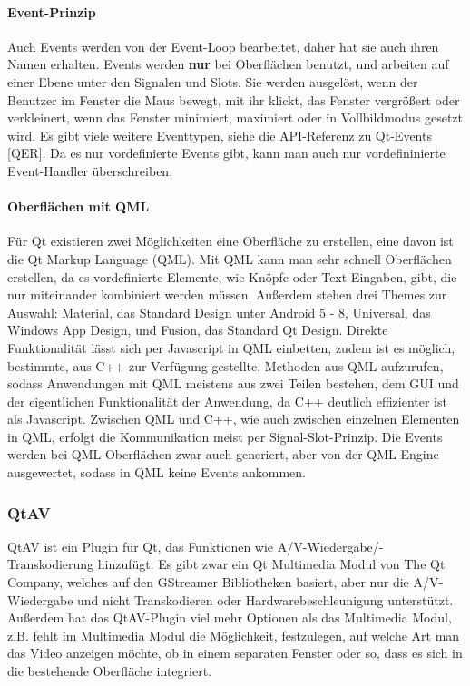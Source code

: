 \documentclass{article}
\begin{document}
    \paragraph{Event-Prinzip}

    Auch Events werden von der Event-Loop bearbeitet, daher hat sie auch
    ihren Namen erhalten. Events werden \textbf{nur} bei Oberflächen
    benutzt, und arbeiten auf einer Ebene unter den Signalen und Slots. Sie
    werden ausgelöst, wenn der Benutzer im Fenster die Maus bewegt, mit ihr
    klickt, das Fenster vergrößert oder verkleinert, wenn das Fenster
    minimiert, maximiert oder in Vollbildmodus gesetzt wird. Es gibt viele
    weitere Eventtypen, siehe die API-Referenz zu Qt-Events {[}QER{]}.
    Da es nur vordefinierte Events gibt, kann man auch nur vordefininierte Event-Handler überschreiben.

    \paragraph{Oberflächen mit QML}
    Für Qt existieren zwei Möglichkeiten eine Oberfläche zu erstellen, eine davon ist die Qt Markup Language (QML).
    Mit QML kann man sehr schnell Oberflächen erstellen, da es vordefinierte Elemente, wie Knöpfe oder Text-Eingaben, gibt, die nur miteinander kombiniert werden müssen.
    Außerdem stehen drei Themes zur Auswahl: Material, das Standard Design unter Android 5 - 8, Universal, das Windows App Design, und Fusion, das Standard Qt Design.
    Direkte Funktionalität lässt sich per Javascript in QML einbetten, zudem ist es möglich, bestimmte, aus C++ zur Verfügung gestellte,
    Methoden aus QML aufzurufen, sodass Anwendungen mit QML meistens aus zwei Teilen bestehen, dem GUI und
    der eigentlichen Funktionalität der Anwendung, da C++ deutlich effizienter ist als Javascript.
    Zwischen QML und C++, wie auch zwischen einzelnen Elementen in QML, erfolgt die Kommunikation meist per Signal-Slot-Prinzip.
    Die Events werden bei QML-Oberflächen zwar auch generiert, aber von der QML-Engine ausgewertet, sodass in QML keine Events ankommen.

    \subsubsection{QtAV}\label{subsubsec:qtav}

    QtAV ist ein Plugin für Qt, das Funktionen wie A/V-Wiedergabe/-Transkodierung hinzufügt.
    Es gibt zwar ein Qt Multimedia Modul von The Qt Company, welches auf den GStreamer Bibliotheken basiert,
    aber nur die A/V-Wiedergabe und nicht Transkodieren oder Hardwarebeschleunigung unterstützt.
    Außerdem hat das QtAV-Plugin viel mehr Optionen als das Multimedia Modul,
    z.B. fehlt im Multimedia Modul die Möglichkeit, festzulegen,
    auf welche Art man das Video anzeigen möchte, ob in einem separaten Fenster oder so,
    dass es sich in die bestehende Oberfläche integriert.
\end{document}
